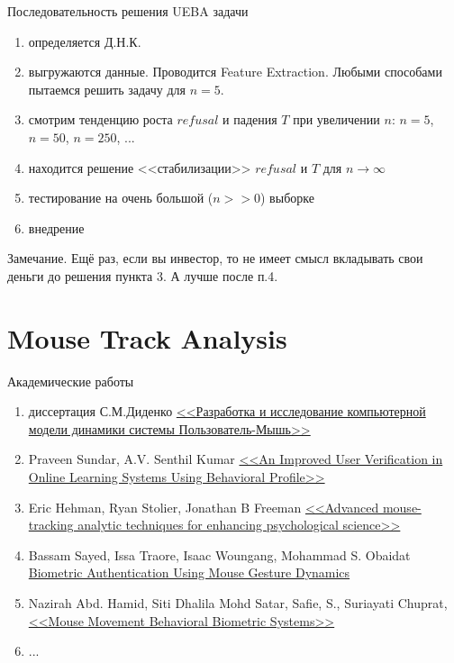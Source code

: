 \begin{frame}{Последовательность решения UEBA задачи}
	\begin{enumerate}
		\item определяется Д.Н.К.
		\item выгружаются данные. Проводится Feature Extraction. 
		Любыми способами пытаемся решить задачу для $n=5$.
		\item смотрим тенденцию роста $refusal$ и падения $T$
		при увеличении $n$: $n=5$, $n=50$, $n=250$, ...
		\item находится решение <<стабилизации>>
		 $refusal$ и  $T$ для $n \longrightarrow \infty$
		\item тестирование на очень большой ($n >> 0$) выборке 
		\item внедрение
	\end{enumerate}
	\begin{block}{Замечание.}
		Ещё раз, если вы инвестор, то не имеет смысл вкладывать свои деньги
		до решения пункта 3. А лучше после п.4.
	\end{block}
\end{frame}

\section{Mouse Track Analysis}\label{section:mca}

\begin{frame}{Академические работы}
	\footnotesize
	\begin{enumerate}
		\item 
		диссертация
		С.М.Диденко
		\href{http://www.tmnlib.ru/jirbis/files/upload/abstract/05.13.18/605.pdf}{<<Разработка и исследование компьютерной модели динамики системы Пользователь-Мышь>>}
		\item 
		Praveen Sundar,
		A.V. Senthil Kumar
		\href{https://www.researchgate.net/publication/309558781_An_Improved_User_Verification_in_Online_Learning_Systems_Using_Behavioral_Profile}{<<An Improved User Verification in Online Learning Systems Using Behavioral Profile>>}
		\item Eric Hehman,
		Ryan Stolier,
		Jonathan B Freeman
		\href{https://www.researchgate.net/publication/276140699_Advanced_mouse-tracking_analytic_techniques_for_enhancing_psychological_science}{<<Advanced mouse-tracking analytic techniques for enhancing psychological science>>}
		\item 
		Bassam Sayed,
		Issa Traore,
		Isaac Woungang,
		Mohammad S. Obaidat
		\href{https://www.researchgate.net/publication/258792177_Biometric_Authentication_Using_Mouse_Gesture_Dynamics}{Biometric Authentication Using Mouse Gesture Dynamics}
		\item 
		Nazirah Abd. Hamid,
		Siti Dhalila Mohd Satar,
		Safie, S.,
		Suriayati Chuprat,
		\href{https://www.researchgate.net/publication/249315717_Mouse_Movement_Behavioral_Biometric_Systems}{<<Mouse Movement Behavioral Biometric Systems>>}
		\item ...
	\end{enumerate}
\end{frame}

